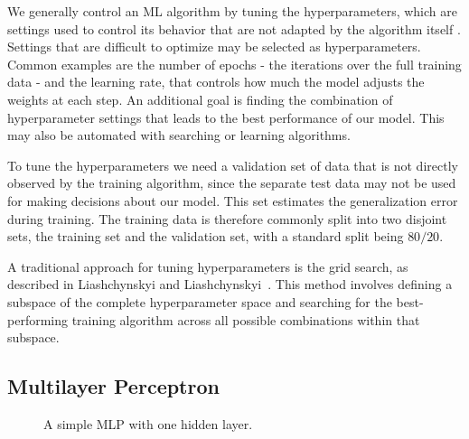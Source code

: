 We generally control an ML algorithm by tuning the hyperparameters, which are settings used to control its behavior that are not adapted by the algorithm itself \cite{Goodfellow-et-al-2016}. Settings that are difficult to optimize may be selected as hyperparameters. Common examples are the number of epochs - the iterations over the full training data - and the learning rate, that controls how much the model adjusts the weights at each step. An additional goal is finding the combination of hyperparameter settings that leads to the best performance of our model. This may also be automated with searching or learning algorithms.

To tune the hyperparameters we need a validation set of data that is not directly observed by the training algorithm, since the separate test data may not be used for making decisions about our model. This set estimates the generalization error during training. The training data is therefore commonly split into two disjoint sets, the training set and the validation set, with a standard split being $80/20$.

A traditional approach for tuning hyperparameters is the grid search, as described in Liashchynskyi and Liashchynskyi~\cite{liashchynskyi2019grid}. This method involves defining a subspace of the complete hyperparameter space and searching for the best-performing training algorithm across all possible combinations within that subspace.

\subsection{Multilayer Perceptron}

\begin{figure}
    \centering
    \caption[A simple MLP with one hidden layer]{A simple MLP with one hidden layer.}
    \label{fig:2layer_mlp}
  \end{figure}


